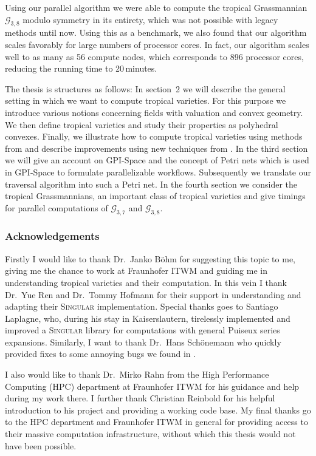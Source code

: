 \documentclass[
  paper=a4,
  titlepage,
  bibliography=totoc,
  pagesize=pdftex
]{scrartcl}
\numberwithin{figure}{section}
\numberwithin{equation}{section}
\numberwithin{table}{section}
\theoremstyle{definition}
\numberwithin{definition}{section}
\begin{document}
Using our parallel algorithm we were able to compute the tropical Grassmannian $\mathcal
G_{3,8}$ modulo symmetry in its entirety, which was not possible with legacy methods until
now. Using this as a benchmark, we also found that our algorithm scales favorably for
large numbers of processor cores. In fact, our algorithm scales well to as many as 56
compute nodes, which corresponds to 896 processor cores, reducing the running time to
20\,minutes.

The thesis is structures as follows: In section~2 we will describe the general setting in
which we want to compute tropical varieties. For this purpose we introduce various notions
concerning fields with valuation and convex geometry. We then define tropical varieties
and study their properties as polyhedral convexes. Finally, we illustrate how to compute
tropical varieties using methods from \cite{compTropVar} and describe improvements using
new techniques from \cite{tropPointsLinks}. In the third section we will give an account
on GPI-Space and the concept of Petri nets which is used in GPI-Space to formulate
parallelizable workflows. Subsequently we translate our traversal algorithm into such a
Petri net. In the fourth section we consider the tropical Grassmannians, an important
class of tropical varieties and give timings for parallel computations of $\mathcal
G_{3,7}$ and $\mathcal G_{3,8}$.

\subsubsection*{Acknowledgements}
Firstly I would like to thank Dr.~Janko Böhm for suggesting this topic to me, giving me
the chance to work at Fraunhofer ITWM and guiding me in understanding tropical varieties
and their computation. In this vein I thank Dr.~Yue Ren and Dr.~Tommy Hofmann for their
support in understanding and adapting their \textsc{Singular} implementation. Special
thanks goes to Santiago Laplagne, who, during his stay in Kaiserslautern, tirelessly
implemented and improved a \textsc{Singular} library for computations with general Puiseux
series expansions. Similarly, I want to thank Dr.~Hans Schönemann who quickly provided
fixes to some annoying bugs we found in .

I also would like to thank Dr.~Mirko Rahn from the High Performance Computing (HPC)
department at Fraunhofer ITWM for his guidance and help during my work there. I further
thank Christian Reinbold for his helpful introduction to his project and providing a
working code base. My final thanks go to the HPC department and Fraunhofer ITWM in general
for providing access to their massive computation infrastructure, without which this
thesis would not have been possible.
\end{document}
